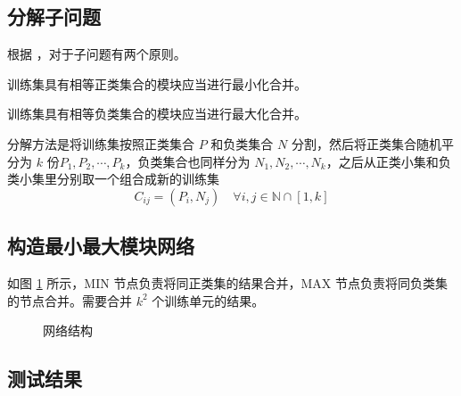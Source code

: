    \subsection{分解子问题}

    根据 \cite{minmax}，对于子问题有两个原则。
    \begin{lemma}[最小化原则]\label{lemma:min}
        训练集具有相等正类集合的模块应当进行最小化合并。
    \end{lemma}
    \begin{lemma}[最大化原则]\label{lemma:max}
        训练集具有相等负类集合的模块应当进行最大化合并。
    \end{lemma}

    分解方法是将训练集按照正类集合 $P$ 和负类集合 $N$ 分割，然后将正类集合随机平分为 $k$ 份$P_1,P_2,\cdots,P_k$，负类集合也同样分为 $N_1,N_2,\cdots,N_k$，之后从正类小集和负类小集里分别取一个组合成新的训练集
    \begin{equation*}
        C_{ij} = (P_i, N_j)\quad \forall i,j\in\mathbb{N}\cap[1,k]
    \end{equation*}

    \subsection{构造最小最大模块网络}


    如图 \ref{fig:minmax} 所示，MIN 节点负责将同正类集的结果合并，MAX 节点负责将同负类集的节点合并。需要合并 $k^2$ 个训练单元的结果。

    \begin{figure}[H]
        \centering
        
        \caption{网络结构}\label{fig:minmax}
    \end{figure}



    \subsection{测试结果}

